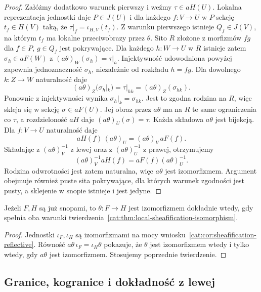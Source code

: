 \begin{proof}
Załóżmy dodatkowo warunek pierwszy i weźmy $\tau\in aH(U)$. Lokalna reprezentacja jednostki daje $P\in J(U)$ i dla każdego $f:V\to U$ w $P$ sekcję $t_f\in H(V)$ taką, że $\tau|_f=\iota_{H,V}(t_f)$. Z warunku pierwszego istnieje $Q_f\in J(V)$, na którym $t_f$ ma lokalne przeciwobrazy przez $\theta$. Sito $R$ złożone z morfizmów $fg$ dla $f\in P$, $g\in Q_f$ jest pokrywające. Dla każdego $h:W\to U$ w $R$ istnieje zatem $\sigma_h\in aF(W)$ z $(a\theta)_W(\sigma_h)=\tau|_h$. Injektywność udowodniona powyżej zapewnia jednoznaczność $\sigma_h$, niezależnie od rozkładu $h=fg$. Dla dowolnego $k:Z\to W$ naturalność daje
\[
 (a\theta)_Z(\sigma_h|_k)=\tau|_{hk}
 =(a\theta)_Z(\sigma_{hk}).
\]
Ponownie z injektywności wynika $\sigma_h|_k=\sigma_{hk}$. Jest to zgodna rodzina na $R$, więc skleja się w sekcję $\sigma\in aF(U)$. Jej obraz przez $a\theta$ ma na $R$ te same ograniczenia co $\tau$, a rozdzieloność $aH$ daje $(a\theta)_U(\sigma)=\tau$. Każda składowa $a\theta$ jest bijekcją. Dla $f:V\to U$ naturalność daje
\[
 aH(f)\,(a\theta)_U=(a\theta)_V\,aF(f).
\]
Składając z $(a\theta)_V^{-1}$ z lewej oraz z $(a\theta)_U^{-1}$ z prawej, otrzymujemy
\[
 (a\theta)_V^{-1}aH(f)=aF(f)(a\theta)_U^{-1}.
\]
Rodzina odwrotności jest zatem naturalna, więc $a\theta$ jest izomorfizmem. Argument obejmuje również puste sita pokrywające, dla których warunek zgodności jest pusty, a sklejenie w snopie istnieje i jest jedyne.
\end{proof}

\begin{wniosek}\label{cat:cor:sheafification-local-criterion}
Jeżeli $F,H$ są już snopami, to $\theta:F\to H$ jest izomorfizmem dokładnie wtedy, gdy spełnia oba warunki twierdzenia~\ref{cat:thm:local-sheafification-isomorphism}.
\end{wniosek}
\begin{proof}
Jednostki $\iota_F,\iota_H$ są izomorfizmami na mocy wniosku~\ref{cat:cor:sheafification-reflective}. Równość $a\theta\,\iota_F=\iota_H\theta$ pokazuje, że $\theta$ jest izomorfizmem wtedy i tylko wtedy, gdy $a\theta$ jest izomorfizmem. Stosujemy poprzednie twierdzenie.
\end{proof}

\subsection{Granice, kogranice i dokładność z lewej}

